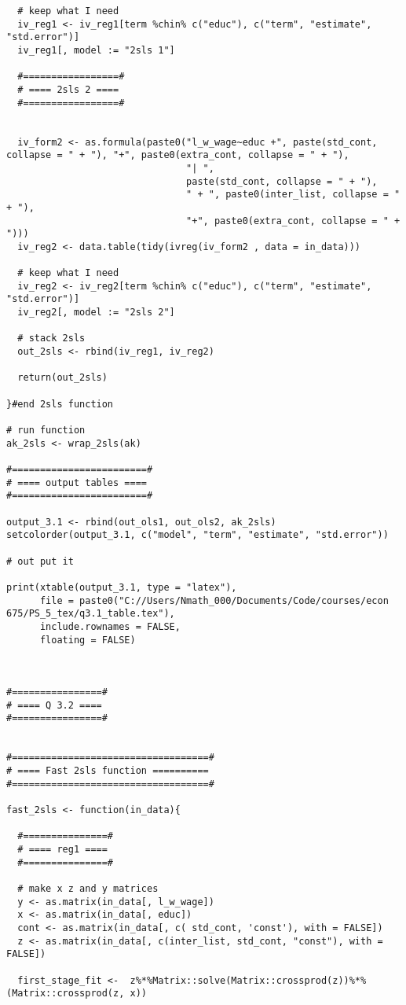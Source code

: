 \documentclass[12pt]{article}
\begin{document}
\begin{verbatim}
  # keep what I need 
  iv_reg1 <- iv_reg1[term %chin% c("educ"), c("term", "estimate", "std.error")]
  iv_reg1[, model := "2sls 1"]
  
  #=================#
  # ==== 2sls 2 ====
  #=================#
  
  
  iv_form2 <- as.formula(paste0("l_w_wage~educ +", paste(std_cont, collapse = " + "), "+", paste0(extra_cont, collapse = " + "),
                                "| ", 
                                paste(std_cont, collapse = " + "), 
                                " + ", paste0(inter_list, collapse = " + "), 
                                "+", paste0(extra_cont, collapse = " + ")))
  iv_reg2 <- data.table(tidy(ivreg(iv_form2 , data = in_data)))
  
  # keep what I need 
  iv_reg2 <- iv_reg2[term %chin% c("educ"), c("term", "estimate", "std.error")]
  iv_reg2[, model := "2sls 2"]
  
  # stack 2sls 
  out_2sls <- rbind(iv_reg1, iv_reg2)
  
  return(out_2sls)
  
}#end 2sls function 

# run function 
ak_2sls <- wrap_2sls(ak)

#========================#
# ==== output tables ====
#========================#

output_3.1 <- rbind(out_ols1, out_ols2, ak_2sls)
setcolorder(output_3.1, c("model", "term", "estimate", "std.error"))

# out put it 

print(xtable(output_3.1, type = "latex"), 
      file = paste0("C://Users/Nmath_000/Documents/Code/courses/econ 675/PS_5_tex/q3.1_table.tex"),
      include.rownames = FALSE,
      floating = FALSE)



#================#
# ==== Q 3.2 ====
#================#


#===================================#
# ==== Fast 2sls function ==========
#===================================#

fast_2sls <- function(in_data){
  
  #===============#
  # ==== reg1 ====
  #===============#
  
  # make x z and y matrices
  y <- as.matrix(in_data[, l_w_wage])
  x <- as.matrix(in_data[, educ])
  cont <- as.matrix(in_data[, c( std_cont, 'const'), with = FALSE])
  z <- as.matrix(in_data[, c(inter_list, std_cont, "const"), with = FALSE])
  
  first_stage_fit <-  z%*%Matrix::solve(Matrix::crossprod(z))%*%(Matrix::crossprod(z, x))
  

\end{verbatim}
\end{document}
